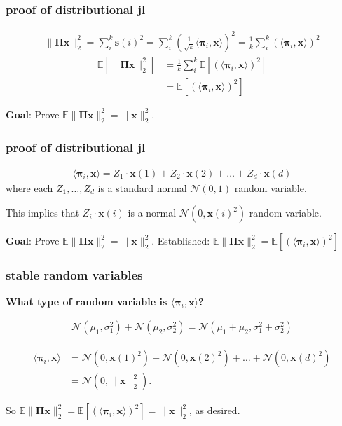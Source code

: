 \documentclass[compress,handout]{beamer}
\newcommand{\bs}[1]{\boldsymbol{#1}}
\newcommand{\bv}[1]{\mathbf{#1}}
\newcommand{\E}{\mathbb{E}}
\begin{document}
\begin{frame}
	\frametitle{proof of distributional jl}
	\begin{align*}
		\|\bs{\Pi} \bv{x} \|_2^2 = \sum_i^k \bv{s}(i)^2 = \sum_i^k \left(\frac{1}{\sqrt{k}}\langle\bs{\pi}_i,\bv{x}\rangle\right)^2 = \frac{1}{k}\sum_i^k \left(\langle\bs{\pi}_i,\bv{x}\rangle\right)^2 
	\end{align*}
	\begin{align*}
		\E\left[\|\bs{\Pi} \bv{x} \|_2^2 \right] &= \frac{1}{k}\sum_i^k \E\left[\left(\langle\bs{\pi}_i,\bv{x}\rangle\right)^2 \right] \\
		& =\E\left[\left(\langle\bs{\pi}_i,\bv{x}\rangle\right)^2 \right] 
	\end{align*}
	\vspace{4em}
	\begin{block}{\vspace*{-3ex}}
		\small \textbf{Goal}: Prove $\E \|\bs{\Pi} \bv{x} \|_2^2 = \|\bv{x}\|_2^2$.
	\end{block}
\end{frame}

\begin{frame}
	\frametitle{proof of distributional jl}	
	\begin{align*}
		\langle\bs{\pi}_i,\bv{x}\rangle = Z_1\cdot\bv{x}(1) + Z_2\cdot\bv{x}(2)  +  \ldots + Z_d\cdot\bv{x}(d)
	\end{align*}
	where each $Z_1, \ldots, Z_d$ is a standard normal $\mathcal{N}(0,1)$ random variable. 
	
	This implies that $Z_i \cdot\bv{x}(i)$ is a normal $\mathcal{N}(0,\bv{x}(i)^2)$ random variable.
	
	\vspace{5em}
	\begin{block}{\vspace*{-3ex}}
		\small \textbf{Goal}: Prove $\E \|\bs{\Pi} \bv{x} \|_2^2 = \|\bv{x}\|_2^2$. Established: $\E \|\bs{\Pi} \bv{x} \|_2^2 = \E\left[\left(\langle\bs{\pi}_i,\bv{x}\rangle\right)^2 \right]$
	\end{block}
\end{frame}

\begin{frame}[t]
	\frametitle{stable random variables}
	\textbf{What type of random variable is $\langle\bs{\pi}_i,\bv{x}\rangle$?}
		\begin{fact}
			\begin{align*}
			\mathcal{N}(\mu_1, \sigma_1^2) + \mathcal{N}(\mu_2, \sigma_2^2) =  \mathcal{N}(\mu_1 + \mu_2, \sigma_1^2 + \sigma_2^2)
			\end{align*}
		\end{fact}
		\begin{align*}
			\langle\bs{\pi}_i,\bv{x}\rangle &= \mathcal{N}(0,\bv{x}(1)^2) + \mathcal{N}(0,\bv{x}(2)^2) + \ldots + \mathcal{N}(0,\bv{x}(d)^2) \\ &= \mathcal{N}(0,\|\bv{x}\|_2^2). 
		\end{align*}
	
	So $\E \|\bs{\Pi} \bv{x} \|_2^2 = \E\left[\left(\langle\bs{\pi}_i,\bv{x}\rangle\right)^2 \right] = \|\bv{x}\|_2^2$, as desired.
\end{frame}
\end{document}
